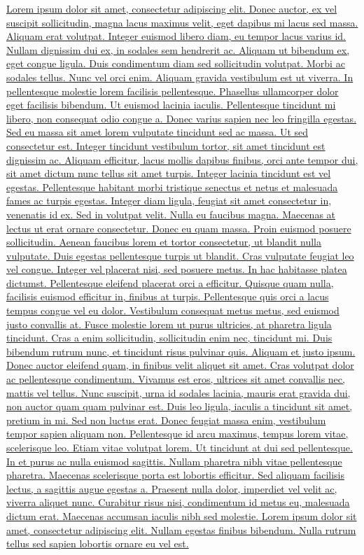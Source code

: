 \href{http://example.com/}{Lorem ipsum dolor sit amet, consectetur adipiscing elit. Donec auctor, ex vel suscipit sollicitudin, magna lacus maximus velit, eget dapibus mi lacus sed massa. Aliquam erat volutpat. Integer euismod libero diam, eu tempor lacus varius id. Nullam dignissim dui ex, in sodales sem hendrerit ac. Aliquam ut bibendum ex, eget congue ligula. Duis condimentum diam sed sollicitudin volutpat. Morbi ac sodales tellus. Nunc vel orci enim. Aliquam gravida vestibulum est ut viverra. In pellentesque molestie lorem facilisis pellentesque. Phasellus ullamcorper dolor eget facilisis bibendum. Ut euismod lacinia iaculis. Pellentesque tincidunt mi libero, non consequat odio congue a. Donec varius sapien nec leo fringilla egestas. Sed eu massa sit amet lorem vulputate tincidunt sed ac massa.
Ut sed consectetur est. Integer tincidunt vestibulum tortor, sit amet tincidunt est dignissim ac. Aliquam efficitur, lacus mollis dapibus finibus, orci ante tempor dui, sit amet dictum nunc tellus sit amet turpis. Integer lacinia tincidunt est vel egestas. Pellentesque habitant morbi tristique senectus et netus et malesuada fames ac turpis egestas. Integer diam ligula, feugiat sit amet consectetur in, venenatis id ex. Sed in volutpat velit. Nulla eu faucibus magna. Maecenas at lectus ut erat ornare consectetur. Donec eu quam massa. Proin euismod posuere sollicitudin. Aenean faucibus lorem et tortor consectetur, ut blandit nulla vulputate. Duis egestas pellentesque turpis ut blandit.
Cras vulputate feugiat leo vel congue. Integer vel placerat nisi, sed posuere metus. In hac habitasse platea dictumst. Pellentesque eleifend placerat orci a efficitur. Quisque quam nulla, facilisis euismod efficitur in, finibus at turpis. Pellentesque quis orci a lacus tempus congue vel eu dolor. Vestibulum consequat metus metus, sed euismod justo convallis at. Fusce molestie lorem ut purus ultricies, at pharetra ligula tincidunt. Cras a enim sollicitudin, sollicitudin enim nec, tincidunt mi. Duis bibendum rutrum nunc, et tincidunt risus pulvinar quis. Aliquam et justo ipsum. Donec auctor eleifend quam, in finibus velit aliquet sit amet. Cras volutpat dolor ac pellentesque condimentum. Vivamus est eros, ultrices sit amet convallis nec, mattis vel tellus. Nunc suscipit, urna id sodales lacinia, mauris erat gravida dui, non auctor quam quam pulvinar est. Duis leo ligula, iaculis a tincidunt sit amet, pretium in mi.
Sed non luctus erat. Donec feugiat massa enim, vestibulum tempor sapien aliquam non. Pellentesque id arcu maximus, tempus lorem vitae, scelerisque leo. Etiam vitae volutpat lorem. Ut tincidunt at dui sed pellentesque. In et purus ac nulla euismod sagittis. Nullam pharetra nibh vitae pellentesque pharetra. Maecenas scelerisque porta est lobortis efficitur. Sed aliquam facilisis lectus, a sagittis augue egestas a. Praesent nulla dolor, imperdiet vel velit ac, viverra aliquet nunc. Curabitur risus nisi, condimentum id metus eu, malesuada dictum erat. Maecenas accumsan iaculis nibh sed molestie. Lorem ipsum dolor sit amet, consectetur adipiscing elit. Nullam egestas finibus bibendum. Nulla rutrum tellus sed sapien lobortis ornare eu vel est.
}
